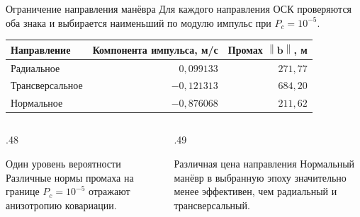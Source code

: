 \documentclass[11pt,aspectratio=169,t]{beamer}
\newcommand{\eqcompact}{\fontsize{10}{12}\selectfont}
\newcommand{\derivationmathspacing}{%
  \setlength{\abovedisplayskip}{2pt}%
  \setlength{\belowdisplayskip}{3pt}%
  \setlength{\abovedisplayshortskip}{2pt}%
  \setlength{\belowdisplayshortskip}{2pt}%
  \setlength{\jot}{2pt}}
\newcommand{\vect}[1]{\boldsymbol{#1}}
\newcommand{\norm}[1]{\left\lVert#1\right\rVert}
\begin{document}
\begin{frame}{Ограничение направления манёвра}
\relax\derivationmathspacing
Для каждого направления ОСК проверяются оба знака и выбирается наименьший по модулю импульс при $P_c=10^{-5}$.
\par\smallskip
\centering
{\eqcompact
\renewcommand{\arraystretch}{1.2}
\begin{tabular}{@{}lrr@{}}
\toprule
Направление & Компонента импульса, м/с & Промах $\norm{\vect b}$, м\\\midrule
Радиальное & $0{,}099133$ & $271{,}77$\\
Трансверсальное & $-0{,}121313$ & $684{,}20$\\
Нормальное & $-0{,}876068$ & $211{,}62$\\
\bottomrule
\end{tabular}\par
}
\raggedright\medskip
\begin{columns}[T,onlytextwidth]
\begin{column}{.48\textwidth}
\begin{block}{Один уровень вероятности}
Различные нормы промаха на границе $P_c=10^{-5}$ отражают анизотропию ковариации.
\end{block}
\end{column}
\begin{column}{.49\textwidth}
\begin{block}{Различная цена направления}
Нормальный манёвр в выбранную эпоху значительно менее эффективен, чем радиальный и трансверсальный.
\end{block}
\end{column}
\end{columns}
\end{frame}
\end{document}
